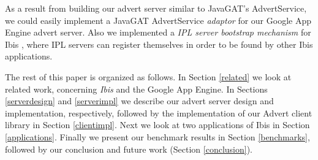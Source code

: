 As a result from building our advert server similar to JavaGAT's AdvertService,
we could easily implement a JavaGAT AdvertService \emph{adaptor} for our
Google App Engine advert server. Also we implemented a \emph{IPL server
bootstrap mechanism} for Ibis \cite{ipl-www}, where IPL servers can register
themselves in order to be found by other Ibis applications.

The rest of this paper is organized as follows. In Section \ref{related}
we look at related work, concerning \emph{Ibis} and the Google App Engine. In
Sections \ref{serverdesign} and \ref{serverimpl} we describe our advert server
design and implementation, respectively, followed by the implementation of our
Advert client library in Section \ref{clientimpl}. Next we look at two
applications of Ibis in Section \ref{applications}. Finally we
present our benchmark results in Section \ref{benchmarks}, followed by our
conclusion and future work (Section \ref{conclusion}).
